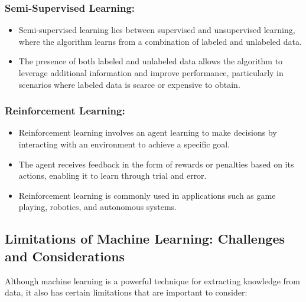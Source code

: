 \subsubsection*{Semi-Supervised Learning:}

\begin{itemize}
    \item{Semi-supervised learning lies between supervised and unsupervised learning, where the algorithm learns from a combination of labeled and unlabeled data.}
    \item{The presence of both labeled and unlabeled data allows the algorithm to leverage additional information and improve performance, particularly in scenarios where labeled data is scarce or expensive to obtain.}
\end{itemize}

\subsubsection*{Reinforcement Learning:}

\begin{itemize}
    \item{Reinforcement learning involves an agent learning to make decisions by interacting with an environment to achieve a specific goal.}
    \item{The agent receives feedback in the form of rewards or penalties based on its actions, enabling it to learn through trial and error.}
    \item{Reinforcement learning is commonly used in applications such as game playing, robotics, and autonomous systems.}
\end{itemize}

\subsection{Limitations of Machine Learning: Challenges and Considerations}

Although machine learning is a powerful technique for extracting knowledge from data, it also has certain limitations that are important to consider:

